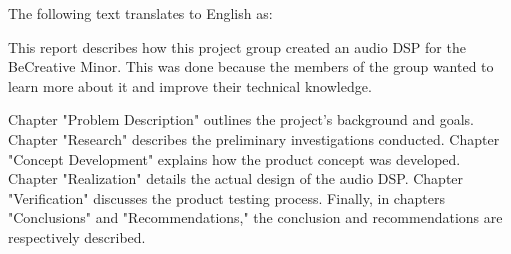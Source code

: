 The following text translates to English as:

This report describes how this project group created an audio DSP for the BeCreative Minor. This was done because the members of the group wanted to learn more about it and improve their technical knowledge.

Chapter "Problem Description" outlines the project's background and goals. Chapter "Research" describes the preliminary investigations conducted. Chapter "Concept Development" explains how the product concept was developed. Chapter "Realization" details the actual design of the audio DSP. Chapter "Verification" discusses the product testing process. Finally, in chapters "Conclusions" and "Recommendations," the conclusion and recommendations are respectively described.